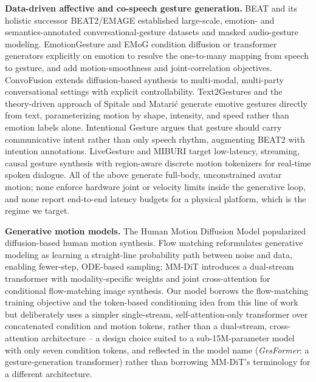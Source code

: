\documentclass[conference]{IEEEtran}
\begin{document}
\textbf{Data-driven affective and co-speech gesture generation.}
BEAT \cite{beat} and its holistic successor BEAT2/EMAGE
\cite{beat2} established large-scale, emotion- and semantics-annotated
conversational-gesture datasets and masked audio-gesture modeling.
EmotionGesture \cite{emotiongesture} and EMoG \cite{emog} condition
diffusion or transformer generators explicitly on emotion to resolve
the one-to-many mapping from speech to gesture, and add motion-smoothness
and joint-correlation objectives. ConvoFusion \cite{convofusion}
extends diffusion-based synthesis to multi-modal, multi-party
conversational settings with explicit controllability. Text2Gestures
\cite{text2gestures} and the theory-driven approach of Spitale and
Matari\'{c} \cite{affective-gestures-theory} generate emotive gestures
directly from text, parameterizing motion by shape, intensity, and
speed rather than emotion labels alone. Intentional Gesture
\cite{intentional-gesture} argues that gesture should carry
communicative intent rather than only speech rhythm, augmenting BEAT2
with intention annotations. LiveGesture \cite{livegesture} and MIBURI
\cite{miburi} target low-latency, streaming, causal gesture synthesis
with region-aware discrete motion tokenizers for real-time spoken
dialogue. All of the above generate full-body, unconstrained avatar
motion; none enforce hardware joint or velocity limits inside the
generative loop, and none report end-to-end latency budgets for a
physical platform, which is the regime we target.

\textbf{Generative motion models.} The Human Motion Diffusion Model
\cite{mdm} popularized diffusion-based human motion synthesis. Flow
matching \cite{flow-matching} reformulates generative modeling as
learning a straight-line probability path between noise and data,
enabling fewer-step, ODE-based sampling; MM-DiT \cite{mmdit} introduces
a dual-stream transformer with modality-specific weights and joint
cross-attention for conditional flow-matching image synthesis. Our
model borrows the flow-matching training objective and the
token-based conditioning idea from this line of work but deliberately
uses a simpler single-stream, self-attention-only transformer over
concatenated condition and motion tokens, rather than a dual-stream,
cross-attention architecture -- a design choice suited to a
sub-15M-parameter model with only seven condition tokens, and reflected
in the model name (\emph{GesFormer}: a gesture-generation transformer)
rather than borrowing MM-DiT's terminology for a different architecture.
\end{document}
